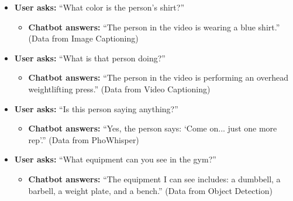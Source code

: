 \begin{itemize}
    \item \textbf{User asks:} ``What color is the person's shirt?''
    \begin{itemize}
        \item \textbf{Chatbot answers:} ``The person in the video is wearing a blue shirt.'' (Data from Image Captioning)
    \end{itemize}

    \item \textbf{User asks:} ``What is that person doing?''
    \begin{itemize}
        \item \textbf{Chatbot answers:} ``The person in the video is performing an overhead weightlifting press.'' (Data from Video Captioning)
    \end{itemize}

    \item \textbf{User asks:} ``Is this person saying anything?''
    \begin{itemize}
        \item \textbf{Chatbot answers:} ``Yes, the person says: `Come on... just one more rep'.'' (Data from PhoWhisper)
    \end{itemize}

    \item \textbf{User asks:} ``What equipment can you see in the gym?''
    \begin{itemize}
        \item \textbf{Chatbot answers:} ``The equipment I can see includes: a dumbbell, a barbell, a weight plate, and a bench.'' (Data from Object Detection)
    \end{itemize}
\end{itemize}